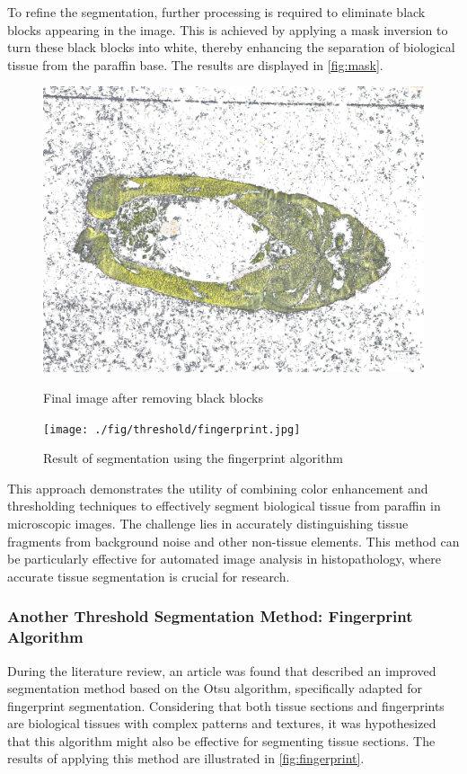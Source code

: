 To refine the segmentation, further processing is required to eliminate black blocks appearing in the image. This is achieved by applying a mask inversion to turn these black blocks into white, thereby enhancing the separation of biological tissue from the paraffin base. The results are displayed in \autoref{fig:mask}.

\begin{figure}[H]
    \centering
    \begin{minipage}{0.4\textwidth}
        \centering
        \includegraphics[width=\textwidth]{./fig/threshold/final.jpg}
        \caption{Final image after removing black blocks}
        \label{fig:mask}
    \end{minipage}
    \begin{minipage}{0.4\textwidth}
        \centering
        \texttt{[image: ./fig/threshold/fingerprint.jpg]}
        \caption{Result of segmentation using the fingerprint algorithm}
        \label{fig:fingerprint}
    \end{minipage}
\end{figure}

This approach demonstrates the utility of combining color enhancement and thresholding techniques to effectively segment biological tissue from paraffin in microscopic images. The challenge lies in accurately distinguishing tissue fragments from background noise and other non-tissue elements. This method can be particularly effective for automated image analysis in histopathology, where accurate tissue segmentation is crucial for research.

\subsubsection{Another Threshold Segmentation Method: Fingerprint Algorithm}
During the literature review, an article was found that described an improved segmentation method based on the Otsu algorithm, specifically adapted for fingerprint segmentation. Considering that both tissue sections and fingerprints are biological tissues with complex patterns and textures, it was hypothesized that this algorithm might also be effective for segmenting tissue sections. The results of applying this method are illustrated in \autoref{fig:fingerprint}.

